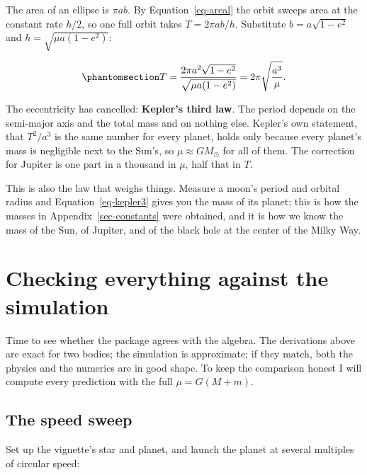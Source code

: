 \documentclass[
  10.5pt,
  letterpaper,
]{scrbook}
\theoremstyle{definition}
\theoremstyle{plain}
\theoremstyle{remark}
\begin{document}
The area of an ellipse is \(\pi a b\). By Equation~\ref{eq-areal} the
orbit sweeps area at the constant rate \(h/2\), so one full orbit takes
\(T = 2\pi ab/h\). Substitute \(b = a\sqrt{1-e^2}\) and
\(h = \sqrt{\mu a (1-e^2)}\):

\begin{equation}\protect\phantomsection\label{eq-kepler3}{
T = \frac{2\pi a^2\sqrt{1-e^2}}{\sqrt{\mu a(1-e^2)}} = 2\pi\sqrt{\frac{a^3}{\mu}}.
}\end{equation}

The eccentricity has cancelled: \textbf{Kepler's third law}. The period
depends on the semi-major axis and the total mass and on nothing else.
Kepler's own statement, that \(T^2/a^3\) is the same number for every
planet, holds only because every planet's mass is negligible next to the
Sun's, so \(\mu \approx GM_\odot\) for all of them. The correction for
Jupiter is one part in a thousand in \(\mu\), half that in \(T\).

This is also the law that weighs things. Measure a moon's period and
orbital radius and Equation~\ref{eq-kepler3} gives you the mass of its
planet; this is how the masses in Appendix~\ref{sec-constants} were
obtained, and it is how we know the mass of the Sun, of Jupiter, and of
the black hole at the center of the Milky Way.

\section{Checking everything against the
simulation}\label{checking-everything-against-the-simulation}

Time to see whether the package agrees with the algebra. The derivations
above are exact for two bodies; the simulation is approximate; if they
match, both the physics and the numerics are in good shape. To keep the
comparison honest I will compute every prediction with the full
\(\mu = G(M+m)\).

\subsection{The speed sweep}\label{the-speed-sweep}

Set up the vignette's star and planet, and launch the planet at several
multiples of circular speed:
\end{document}
